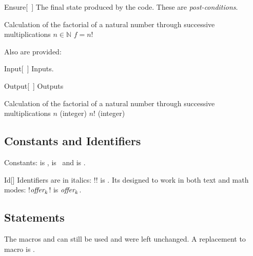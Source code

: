 \documentclass[a4paper, 11pt]{article}
\begin{document}
\begin{macro}{Ensure}[~]
    The final state produced by the code. These are \textit{post-conditions}.
\end{macro}

\begin{tcblisting}{}
    \begin{algorithmic}
        \Description Calculation of the factorial of a natural number through successive multiplications
        \Require $n \in \mathbb{N}$
        \Ensure $f = n!$
    \end{algorithmic}
\end{tcblisting}

Also are provided:
\begin{macro}{Input}[~]
    Inputs.
\end{macro}
\begin{macro}{Output}[~]
    Outputs
\end{macro}

\begin{tcblisting}{}
    \begin{algorithmic}
        \Description Calculation of the factorial of a natural number through successive multiplications
        \Input $n$ (integer)
        \Output $n!$ (integer)
    \end{algorithmic}
\end{tcblisting}

\subsection{Constants and Identifiers}

Constants:  is \True,  is \False\ and  is \Nil.

\begin{macro}{Id}[]
    Identifiers are in italics: \latexinline!! is . Its designed to work in both text and math modes: \latexinline!$\textit{\rmfamily offer}_k$! is $\textit{\rmfamily offer}_k$.
\end{macro}

\subsection{Statements}

The macros  and  can still be used and were left unchanged. A replacement to macro  is .
\end{document}

